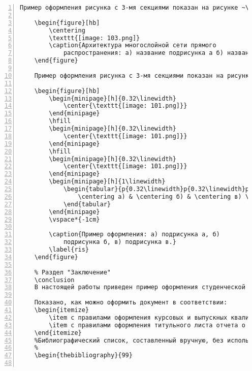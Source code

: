 \documentclass[bachelor, och, pract]{SCWorks}
\begin{document}
\begin{Verbatim}[fontsize=\small, numbers=left]
	Пример оформления рисунка с 3-мя секциями показан на рисунке ~\ref{5} (а, б, в).
	
	\begin{figure}[hb]
		\centering
		\texttt{[image: 103.png]}
		\caption{Архитектура многослойной сети прямого
			распространения: a) название подрисунка а б) название подрисунка б в) название подрисунка в}\label{5}
	\end{figure}
	
	Пример оформления рисунка с 3-мя секциями показан на рисунке ~\ref{ris} (а, б, в).
	
	\begin{figure}[hb]
		\begin{minipage}[h]{0.32\linewidth}
			\center{\texttt{[image: 101.png]}}
		\end{minipage}
		\hfill
		\begin{minipage}[h]{0.32\linewidth}
			\center{\texttt{[image: 101.png]}}
		\end{minipage}
		\hfill
		\begin{minipage}[h]{0.32\linewidth}
			\center{\texttt{[image: 101.png]}}
		\end{minipage}
		\begin{minipage}[h]{1\linewidth}
			\begin{tabular}{p{0.32\linewidth}p{0.32\linewidth}p{0.32\linewidth}}
				\centering а) & \centering б) & \centering в) \\
			\end{tabular}
		\end{minipage}
		\vspace*{-1cm}
		
		\caption{Пример оформления: a) подрисунка а, б)
			подрисунка б, в) подрисунка в.}
		\label{ris}
	\end{figure}
	
	% Раздел "Заключение"
	\conclusion
	В настоящей работы приведен пример оформления студенческой работы средствами системы \LaTeX.
	
	Показано, как можно оформить документ в соответствии:
	\begin{itemize}
		\item с правилами оформления курсовых и выпускных квалификационных работ, принятых в Саратовском государственном университете в 2012 году;
		\item с правилами оформления титульного листа отчета о прохождении практики в соответствии со стандартом.
	\end{itemize}
	%Библиографический список, составленный вручную, без использования BibTeX
	%
	\begin{thebibliography}{99}
		

\end{Verbatim}
\end{document}
